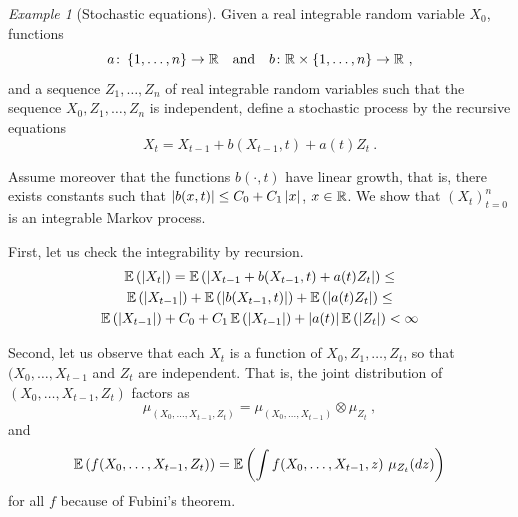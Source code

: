 \documentclass[12pt,a4paper]{amsart}
\theoremstyle{plain}%
\theoremstyle{definition}
\theoremstyle{remark}
\newtheorem{example}{Example}
\begin{document}
\begin{example}[Stochastic equations]
Given a real integrable random variable $X_0$, functions
\begin{equation*}
  a \colon \left\{1,\dots,n\right\} \to \mathbb{R} \quad \text{and} \quad b \colon
  \mathbb{R} \times \left\{1,\dots,n\right\} \to \mathbb{R} \ , 
\end{equation*}
and a sequence $Z_1,\dots,Z_n$ of real integrable random
variables such that the sequence $X_0,Z_1,\dots,Z_n$ is independent, define a stochastic process by the recursive equations
\begin{equation*}
  X_t = X_{t-1} + b(X_{t-1},t) + a(t)Z_t \ .
\end{equation*}

Assume moreover that the functions $b(\cdot,t)$ have linear growth,
that is, there exists constants such that
$\left\vert b(x,t)\right\vert \leq C_0 + C_1\left\vert x\right\vert$, $x \in \mathbb{R}$. We show that
$(X_t)_{t=0}^n$ is an integrable Markov process.

First, let us check the integrability by recursion.
\begin{multline*}
  \operatorname{\mathbb E}\left(\left\vert X_t\right\vert\right) = \operatorname{\mathbb E}\left(\left\vert X_{t-1} + b(X_{t-1},t) +
      a(t)Z_t\right\vert\right) \leq \\ \operatorname{\mathbb E}\left(\left\vert X_{t-1}\right\vert\right) +
    \operatorname{\mathbb E}\left(\left\vert b(X_{t-1},t)\right\vert\right) + \operatorname{\mathbb E}\left(\left\vert a(t)Z_t\right\vert\right) \leq
  \\ \operatorname{\mathbb E}\left(\left\vert X_{t-1}\right\vert\right) +
    C_0 + C_1 \operatorname{\mathbb E}\left(\left\vert X_{t-1}\right\vert\right) + \left\vert a(t)\right\vert
    \operatorname{\mathbb E}\left(\left\vert Z_t\right\vert\right) <  \infty
  \end{multline*}

Second, let us observe that each $X_{t}$ is a function of
$X_0,Z_1,\dots,Z_{t}$, so that $(X_0,\dots,X_{t-1}$ and $Z_t$ are independent.
That is, the joint distribution of $(X_0,\dots,X_{t-1},Z_t)$ factors as
\begin{equation*}
  \mu_{(X_0,\dots,X_{t-1},Z_t)} = \mu_{(X_0,\dots,X_{t-1})} \otimes
  \mu_{Z_t} \ ,
\end{equation*}
and
\begin{equation*}
  \operatorname{\mathbb E}\left(f(X_0,\dots,X_{t-1},Z_t)\right) = \operatorname{\mathbb E}\left(\int
    f(X_0,\dots,X_{t-1},z) \ \mu_{Z_t}(dz)\right)
\end{equation*}
for all $f$ because of Fubini's theorem.


\end{example}
\end{document}
